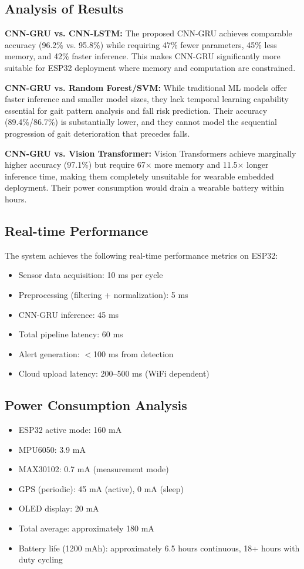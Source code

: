 \documentclass[conference]{IEEEtran}
\begin{document}
\subsection{Analysis of Results}

\textbf{CNN-GRU vs. CNN-LSTM:} The proposed CNN-GRU achieves comparable accuracy (96.2\% vs. 95.8\%) while requiring 47\% fewer parameters, 45\% less memory, and 42\% faster inference. This makes CNN-GRU significantly more suitable for ESP32 deployment where memory and computation are constrained.

\textbf{CNN-GRU vs. Random Forest/SVM:} While traditional ML models offer faster inference and smaller model sizes, they lack temporal learning capability essential for gait pattern analysis and fall risk prediction. Their accuracy (89.4\%/86.7\%) is substantially lower, and they cannot model the sequential progression of gait deterioration that precedes falls.

\textbf{CNN-GRU vs. Vision Transformer:} Vision Transformers achieve marginally higher accuracy (97.1\%) but require 67$\times$ more memory and 11.5$\times$ longer inference time, making them completely unsuitable for wearable embedded deployment. Their power consumption would drain a wearable battery within hours.

\subsection{Real-time Performance}

The system achieves the following real-time performance metrics on ESP32:
\begin{itemize}
    \item Sensor data acquisition: 10 ms per cycle
    \item Preprocessing (filtering + normalization): 5 ms
    \item CNN-GRU inference: 45 ms
    \item Total pipeline latency: 60 ms
    \item Alert generation: $<$100 ms from detection
    \item Cloud upload latency: 200--500 ms (WiFi dependent)
\end{itemize}

\subsection{Power Consumption Analysis}

\begin{itemize}
    \item ESP32 active mode: 160 mA
    \item MPU6050: 3.9 mA
    \item MAX30102: 0.7 mA (measurement mode)
    \item GPS (periodic): 45 mA (active), 0 mA (sleep)
    \item OLED display: 20 mA
    \item Total average: approximately 180 mA
    \item Battery life (1200 mAh): approximately 6.5 hours continuous, 18+ hours with duty cycling
\end{itemize}
\end{document}
